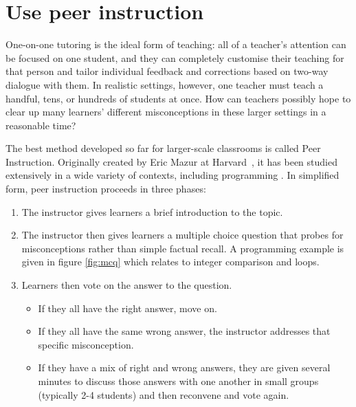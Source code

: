 \documentclass{article}
\begin{document}
\section{Use peer instruction}\label{peer-instruction}

One-on-one tutoring is the ideal form of teaching:
all of a teacher's attention can be focused on one student,
and they can completely customise their teaching for that person
and tailor individual feedback and corrections based on two-way dialogue with them.
In realistic settings,
however,
one teacher must teach a handful, tens, or hundreds of students at once.
How can teachers possibly hope to clear up many learners' different misconceptions
in these larger settings in a reasonable time?

The best method developed so far for larger-scale classrooms is called Peer Instruction.
Originally created by Eric Mazur at Harvard~\citep{mazur-peer-instruction},
it has been studied extensively in a wide variety of contexts,
including programming \citep{porter-multi,porter-success}.
In simplified form,
peer instruction proceeds in three phases:

\begin{enumerate}

\item The instructor gives learners a brief introduction to the topic.

\item The instructor then gives learners a multiple choice question
  that probes for misconceptions rather than simple factual recall.
  A programming example is given in figure \ref{fig:mcq}
  which relates to integer comparison and loops.

\item Learners then vote on the answer to the question.

  \begin{itemize}
  \item If they all have the right answer, move on.
  \item If they all have the same wrong answer,
    the instructor addresses that specific misconception.
  \item If they have a mix of right and wrong answers,
    they are given several minutes to discuss those answers with one another
    in small groups (typically 2-4 students)
    and then reconvene and vote again.
  \end{itemize}

\end{enumerate}
\end{document}
